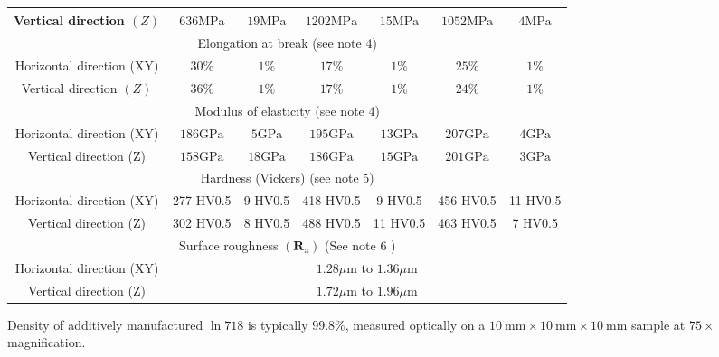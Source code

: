 \documentclass[10pt]{article}
\begin{document}
\begin{center}
\begin{tabular}{|c|c|c|c|c|c|c|}
\hline
Vertical direction $(Z)$ & $636 \mathrm{MPa}$ & $19 \mathrm{MPa}$ & $1202 \mathrm{MPa}$ & $15 \mathrm{MPa}$ & $1052 \mathrm{MPa}$ & $4 \mathrm{MPa}$ \\
\hline
\multicolumn{7}{|c|}{Elongation at break (see note 4)} \\
\hline
Horizontal direction (XY) & $30 \%$ & $1 \%$ & $17 \%$ & $1 \%$ & $25 \%$ & $1 \%$ \\
\hline
Vertical direction $(Z)$ & $36 \%$ & $1 \%$ & $17 \%$ & $1 \%$ & $24 \%$ & $1 \%$ \\
\hline
\multicolumn{7}{|c|}{Modulus of elasticity (see note 4)} \\
\hline
Horizontal direction (XY) & $186 \mathrm{GPa}$ & $5 \mathrm{GPa}$ & $195 \mathrm{GPa}$ & $13 \mathrm{GPa}$ & $207 \mathrm{GPa}$ & $4 \mathrm{GPa}$ \\
\hline
Vertical direction (Z) & $158 \mathrm{GPa}$ & $18 \mathrm{GPa}$ & $186 \mathrm{GPa}$ & $15 \mathrm{GPa}$ & $201 \mathrm{GPa}$ & $3 \mathrm{GPa}$ \\
\hline
\multicolumn{7}{|c|}{Hardness (Vickers) (see note 5)} \\
\hline
Horizontal direction (XY) & 277 HV0.5 & 9 HV0.5 & 418 HV0.5 & 9 HV0.5 & 456 HV0.5 & 11 HV0.5 \\
\hline
Vertical direction (Z) & 302 HV0.5 & 8 HV0.5 & 488 HV0.5 & 11 HV0.5 & 463 HV0.5 & 7 HV0.5 \\
\hline
\multicolumn{7}{|c|}{Surface roughness $\left(\mathbf{R}_{\mathrm{a}}\right)$ (See note 6 )} \\
\hline
Horizontal direction (XY) & \multicolumn{6}{|c|}{$1.28 \mu \mathrm{m}$ to $1.36 \mu \mathrm{m}$} \\
\hline
Vertical direction (Z) & \multicolumn{6}{|c|}{$1.72 \mu \mathrm{m}$ to $1.96 \mu \mathrm{m}$} \\
\hline
\end{tabular}
\end{center}

Density of additively manufactured $\ln 718$ is typically $99.8 \%$, measured optically on a $10 \mathrm{~mm} \times 10 \mathrm{~mm} \times 10 \mathrm{~mm}$ sample at $75 \times$ magnification.
\end{document}
